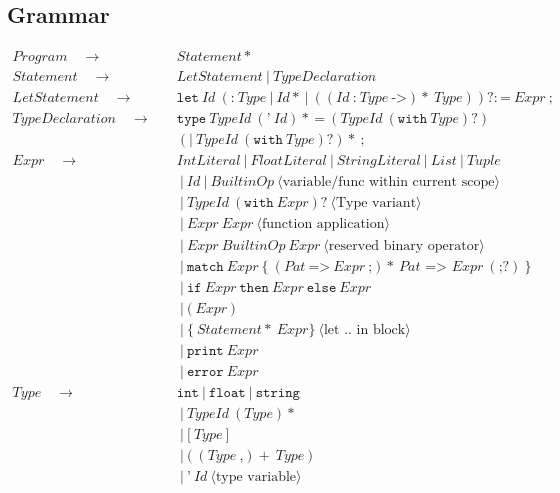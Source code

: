 \documentclass[a4paper, 12pt]{article}
\newcommand{\sepbar}{\: | \:}	%
\newcommand{\substo}{\quad\rightarrow\quad}
\begin{document}
\subsection{Grammar}
\begin{align*}
Program \substo& Statement*\\
Statement \substo& LetStatement \sepbar TypeDeclaration\\
LetStatement \substo& \texttt{let}\: Id \: (\texttt{:}\: Type\sepbar Id* \sepbar ((Id\: \texttt{:}\:Type\:\texttt{->})*\:Type))?:\texttt{=}\: Expr\:\texttt{;}\\
TypeDeclaration \substo& \texttt{type}\: TypeId\: (\texttt{'}\: Id)*\: \texttt{=} \: (TypeId \: (\texttt{with}\: Type)?)\\
&(\texttt{|}\:TypeId \: (\texttt{with}\: Type)?)*\:\texttt{;}\\
Expr\substo& IntLiteral \sepbar FloatLiteral \sepbar StringLiteral \sepbar List \sepbar Tuple\\
& \sepbar Id \sepbar BuiltinOp\:\langle\text{variable/func within current scope}\rangle\\
& \sepbar TypeId\: (\texttt{with}\: Expr)?\: \langle\text{Type variant}\rangle\\
& \sepbar Expr\:Expr\:\langle\text{function application}\rangle\\
& \sepbar Expr \: BuiltinOp \: Expr\:\langle\text{reserved binary operator}\rangle \\
& \sepbar \texttt{match}\: Expr \: \texttt{\{} \: (Pat \: \texttt{=>}\: Expr\: \texttt{;})*\: Pat\texttt{ => } Expr \: (\texttt{;}?) \: \texttt{\}} \\
& \sepbar \texttt{if}\: Expr \: \texttt{then} \: Expr \: \texttt{else} \: Expr \\
& \sepbar \texttt{(}\: Expr \:\texttt{)}\\
& \sepbar \texttt{\{}\: Statement*\: Expr\texttt{\}} \:\langle \text{let .. in block}\rangle\\
& \sepbar \texttt{print} \: Expr \\
& \sepbar \texttt{error} \: Expr \\
Type \substo& \texttt{int} \sepbar \texttt{float} \sepbar \texttt{string}\\
& \sepbar TypeId\: (Type)*\\
& \sepbar \texttt{[}\:Type\:\texttt{]}\\
& \sepbar \texttt{(} \: (Type\: \texttt{,} )+\: Type\: \texttt{)}\\
& \sepbar \texttt{'}\:Id \: \langle\text{type variable}\rangle\\

\end{align*}
\end{document}
